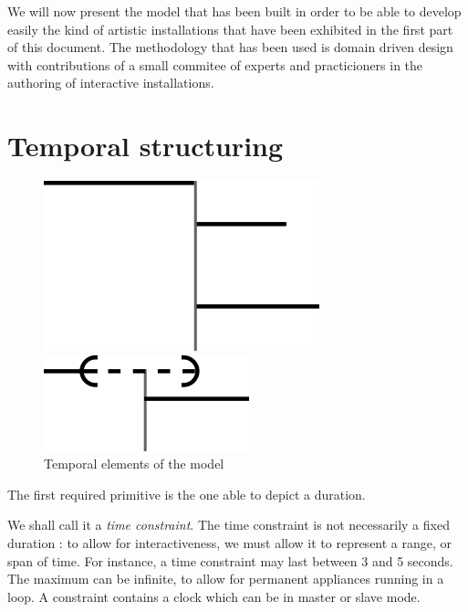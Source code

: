 \documentclass{sigchi}
\begin{document}
We will now present the model that has been built in order to be able to develop easily the kind of artistic installations that have been exhibited in the first part of this document. The methodology that has been used is domain driven design with contributions of a small commitee of experts and practicioners in the authoring of interactive installations. 
\section{Temporal structuring}
\label{sectemporal}
\begin{figure}[h]
    \centering
    \begin{minipage}[b]{.5\linewidth}
        \centering
        \includegraphics[scale=0.7]{images/timenode.png}
    \end{minipage}\begin{minipage}[b]{.5\linewidth}
    \centering
    \includegraphics[scale=0.7]{images/souple.png}
\end{minipage}	

\caption{Temporal elements of the model}
\label{fig.cst.timenode}
\end{figure}	

The first required primitive is the one able to depict a duration.

We shall call it a \textit{time constraint}.
The time constraint is not necessarily a fixed duration : to allow for interactiveness, 
we must allow it to represent a range, or span of time. For instance, a time constraint may last between 3 and 5 seconds. The maximum can be infinite, to allow for permanent appliances running in a loop. A constraint contains a clock which can be in master or slave mode.
\end{document}
